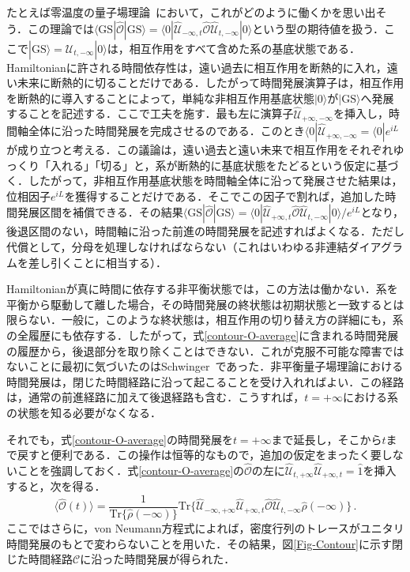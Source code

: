 \documentclass[a4paper,11pt]{ltjsarticle}
\def\Tr{\mathrm{Tr}}
\begin{document}
たとえば零温度の量子場理論~\cite{AGD}において，これがどのように働くかを思い出そう．この理論では$\langle\mathrm{GS}|\hat{\mathcal{O}}|\mathrm{GS}\rangle=
\langle0|\hat{\mathcal{U}}_{-\infty,t}\hat{\mathcal{O}}
\hat{\mathcal{U}}_{t,-\infty}|0\rangle$という型の期待値を扱う．ここで$|\mathrm{GS}\rangle=\hat{\mathcal{U}}_{t,-\infty}|0\rangle$は，相互作用をすべて含めた系の基底状態である．Hamiltonianに許される時間依存性は，遠い過去に相互作用を断熱的に入れ，遠い未来に断熱的に切ることだけである．したがって時間発展演算子は，相互作用を断熱的に導入することによって，単純な非相互作用基底状態$|0\rangle$が$|\mathrm{GS}\rangle$へ発展することを記述する．ここで工夫を施す．最も左に演算子$\hat{\mathcal{U}}_{+\infty,-\infty}$を挿入し，時間軸全体に沿った時間発展を完成させるのである．このとき$\langle0|\hat{\mathcal{U}}_{+\infty,-\infty}=\langle0|e^{iL}$が成り立つと考える．この議論は，遠い過去と遠い未来で相互作用をそれぞれゆっくり「入れる」「切る」と，系が断熱的に基底状態をたどるという仮定に基づく．したがって，非相互作用基底状態を時間軸全体に沿って発展させた結果は，位相因子$e^{iL}$を獲得することだけである．そこでこの因子で割れば，追加した時間発展区間を補償できる．その結果$\langle\mathrm{GS}|\hat{\mathcal{O}}|\mathrm{GS}\rangle=
\langle0|\hat{\mathcal{U}}_{+\infty,t}\hat{\mathcal{O}}
\hat{\mathcal{U}}_{t,-\infty}|0\rangle/e^{iL}$となり，後退区間のない，時間軸に沿った前進の時間発展を記述すればよくなる．ただし代償として，分母を処理しなければならない（これはいわゆる非連結ダイアグラムを差し引くことに相当する）．


Hamiltonianが真に時間に依存する非平衡状態では，この方法は働かない．系を平衡から駆動して離した場合，その時間発展の終状態は初期状態と一致するとは限らない．一般に，このような終状態は，相互作用の切り替え方の詳細にも，系の全履歴にも依存する．したがって，式\eqref{contour-O-average}に含まれる時間発展の履歴から，後退部分を取り除くことはできない．これが克服不可能な障害ではないことに最初に気づいたのはSchwinger~\cite{Schwinger:1960qe}であった．非平衡量子場理論における時間発展は，閉じた時間経路に沿って起こることを受け入れればよい．この経路は，通常の前進経路に加えて後退経路も含む．こうすれば，$t=+\infty$における系の状態を知る必要がなくなる．


それでも，式\eqref{contour-O-average}の時間発展を$t=+\infty$まで延長し，そこから$t$まで戻すと便利である．この操作は恒等的なもので，追加の仮定をまったく要しないことを強調しておく．式\eqref{contour-O-average}の$\hat{\mathcal{O}}$の左に$\hat{\mathcal{U}}_{t,+\infty}\hat{\mathcal{U}}_{+\infty,t}=\hat{1}$を挿入すると，次を得る．
\begin{equation}
\big\langle\hat{\mathcal{O}}(t)\big\rangle=\frac{1}{\Tr\{\hat{\rho}(-\infty)\}}
\Tr\big\{\hat{\mathcal{U}}_{-\infty,+\infty}\hat{\mathcal{U}}_{+\infty,t}
\hat{\mathcal{O}}\hat{\mathcal{U}}_{t,-\infty}\hat{\rho}(-\infty)\big\}\,.
\end{equation}ここではさらに，von Neumann方程式によれば，密度行列のトレースがユニタリ時間発展のもとで変わらないことを用いた．その結果，図\ref{Fig-Contour}に示す閉じた時間経路$\mathcal{C}$に沿った時間発展が得られた．
\end{document}
